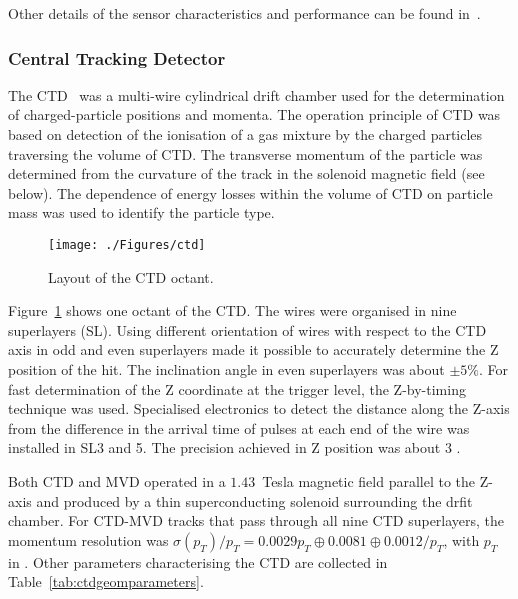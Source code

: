 Other details of the sensor characteristics and performance can be found in~\cite{nim:a581:656,tech:mvd:prc9701,Foster:1993ja}.

\subsubsection{Central Tracking Detector}
\label{subsubsec:ctd}
The CTD~\cite{nim:a283:477,nim:a279:290,npps:b32:181} was a multi-wire cylindrical drift chamber used for the determination of charged-particle positions and momenta. The operation principle of CTD was based on detection of the ionisation of a gas mixture by the charged particles traversing the volume of CTD. The transverse momentum of the particle was determined from the curvature of the track in the solenoid magnetic field (see below). The dependence of energy losses within the volume of CTD on particle mass was used to identify the particle type.
\begin{figure}[htpb]
	\centering
		\texttt{[image: ./Figures/ctd]}
	\caption{Layout of the CTD octant.}
	\label{fig:ctd}
\end{figure}
Figure~\ref{fig:ctd} shows one octant of the CTD. The wires were organised in nine superlayers (SL). Using different orientation of wires with respect to the CTD axis in odd and even superlayers made it possible to accurately determine the Z position of the hit. The inclination angle in even superlayers was about $\pm 5\%$. For fast determination of the Z coordinate at the trigger level, the Z-by-timing technique was used. Specialised electronics to detect the distance along the Z-axis from the difference in the arrival time of pulses at each end of the wire was installed in SL3 and 5. The precision achieved in Z position was about 3 \cm.

Both CTD and MVD operated in a $1.43$~Tesla magnetic field parallel to the Z-axis and produced by a thin superconducting solenoid surrounding the drfit chamber. For CTD-MVD tracks that pass through all nine CTD superlayers, the momentum resolution was $\sigma(p_{T})/p_{T} = 0.0029 p_{T} \oplus 0.0081 \oplus
0.0012/p_{T}$, with $p_{T}$ in \GeV. Other parameters characterising the CTD are collected in Table~\ref{tab:ctdgeomparameters}.

